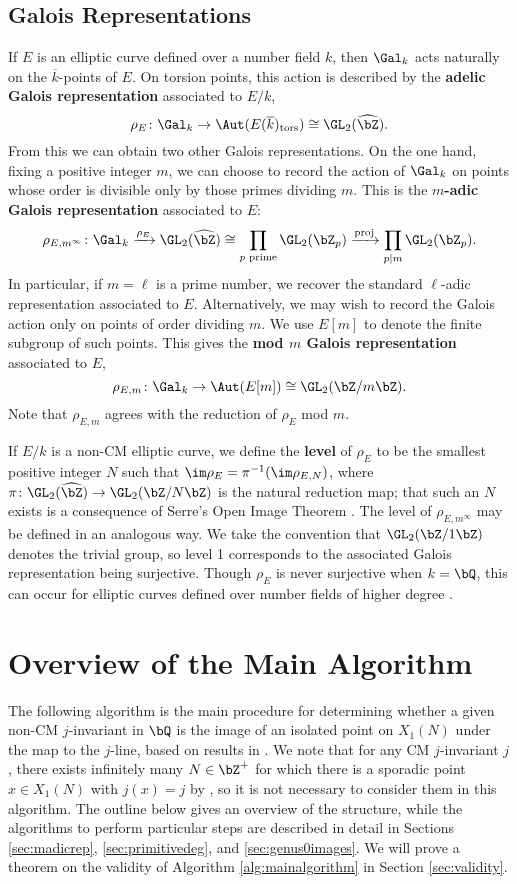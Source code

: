 \documentclass[11pt,reqno]{amsart}
\theoremstyle{plain}
\theoremstyle{definition}
\newcommand{\Q}{\bQ}
\newcommand{\Z}{\bZ}
\newcommand{\proj}{\operatorname{proj}}
\begin{document}
\subsection{Galois Representations} If $E$ is an elliptic curve defined over a number field $k$, then $\Gal_k$ acts naturally on the $\overline{k}$-points of $E$. On torsion points, this action is described by the \textbf{adelic Galois representation} associated to $E/k$,
\[
\rho_{E}\colon \Gal_k \rightarrow \Aut(E(\overline{k})_{\text{tors}}) \cong \GL_2(\widehat{\Z}).
\]
From this we can obtain two other Galois representations. On the one hand, fixing a positive integer $m$, we can choose to record the action of $\Gal_k$ on points whose order is divisible only by those primes dividing $m$. This is the \textbf{$m$-adic Galois representation} associated to $E$:
\[
\rho_{E,m^{\infty}}\colon \Gal_k \xrightarrow{\rho_E} \GL_2(\widehat{\Z}) \cong  \prod_{p \text{ prime}} \GL_2(\Z_{p}) \xrightarrow{\proj} \prod_{p \mid m} \GL_2(\Z_{p}).
\]
In particular, if $m=\ell$ is a prime number, we recover the standard $\ell$-adic representation associated to $E$. Alternatively, we may wish to record the Galois action only on points of order dividing $m$. We use $E[m]$ to denote the finite subgroup of such points. This gives the \textbf{mod $m$ Galois representation} associated to $E$,
\[
\rho_{E,m}\colon \Gal_k \rightarrow \Aut(E[m]) \cong \GL_2(\Z/m\Z).
\]
Note that $\rho_{E,m}$ agrees with the reduction of $\rho_E$ mod $m$.

If $E/k$ is a non-CM elliptic curve, we define the \textbf{level} of $\rho_E$ to be the smallest positive integer $N$ such that $\im \rho_E=\pi^{-1}(\im \rho_{E,N})$, where $\pi\colon\GL_2(\widehat{\Z}) \rightarrow \GL_2(\Z/N\Z)$ is the natural reduction map; that such an $N$ exists is a consequence of Serre's Open Image Theorem \cite{serre72}. The level of $\rho_{E,m^{\infty}}$ may be defined in an analogous way. We take the convention that $\GL_2(\Z/1\Z)$ denotes the trivial group, so level 1 corresponds to the associated Galois representation being surjective. Though $\rho_E$ is never surjective when $k=\Q$, this can occur for elliptic curves defined over number fields of higher degree \cite[Theorem 1.2]{Greicius2010}.

\section{Overview of the Main Algorithm}
\label{sec:mainalg}
The following algorithm is the main procedure for determining whether a given non-CM $j$-invariant in $\Q$ is the image of an isolated point on $X_1(N)$ under the map to the $j$-line, based on results in \cite{BELOV,ZywinaAlgorithm}. We note that for any CM $j$-invariant $j$, there exists infinitely many $N\in\Z^+$ for which there is a sporadic point $x\in X_1(N)$ with $j(x)=j$ by \cite[Theorem 7.1]{BELOV}, so it is not necessary to consider them in this algorithm. The outline below gives an overview of the structure, while the algorithms to perform particular steps are described in detail in Sections \ref{sec:madicrep}, \ref{sec:primitivedeg}, and \ref{sec:genus0images}. We will prove a theorem on the validity of Algorithm \ref{alg:mainalgorithm} in Section \ref{sec:validity}.
\end{document}
